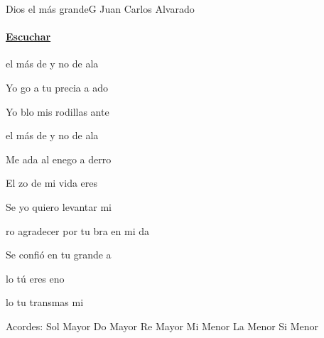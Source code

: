 \documentclass[12pt, spanish]{book}
\newcommand{\NotCCLIed}{\relax}
\begin{document}
    \begin{song}{Dios el más grande}{G}
    {} %
    {Juan Carlos Alvarado}
    {} %
    {} %
        \ifChordBk
            \paragraph{\mbox{}\hfill\protect\href{https://open.spotify.com/intl-es/track/06kZDGAxb4sEDwFp4pkdc4}{Escuchar}\mbox{}\hfill}
        \fi

        \begin{SBOpGroup}
             el más de y no de ala

            Yo go a tu precia a ado

            Yo blo mis rodillas ante  
        \end{SBOpGroup}

        \begin{SBOpGroup}
             el más de y no de ala

            Me ada al enego a derro

            El zo de mi vida eres 
        \end{SBOpGroup}

        \begin{SBChorus}
            Se yo quiero levantar mi 

            ro agradecer      por tu bra en mi da

            Se confió en tu grande a

            lo tú eres  eno

            lo tu transmas mi 
        \end{SBChorus}

        \ifChordBk
        \begin{SBOpGroup}
            Acordes:
            \upchord{\G}\qquad Sol Mayor \hfill
            \upchord{\C}\qquad Do Mayor \hfill\null\break
            \upchord{\D}\qquad Re Mayor \hfill
            \upchord{\Em}\qquad Mi Menor \hfill\null\break
            \upchord{\Am}\qquad La Menor \hfill
            \upchord{\Bm}\qquad Si Menor \hfill\null\break
        \end{SBOpGroup}
        \fi
    \end{song}
\end{document}
